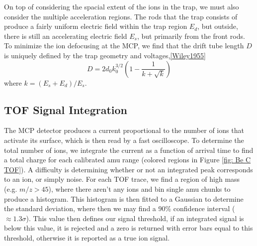 On top of considering the spacial extent of the ions in the trap, we must also consider the multiple acceleration regions. The rods that the trap consists of produce a fairly uniform electric field within the trap region $E_d$, but outside, there is still an accelerating electric field $E_s$, but primarily from the front rods. To minimize the ion defocusing at the MCP, we find that the drift tube length $D$ is uniquely defined by the trap geometry and voltages,\ref{Wiley1955}
\begin{equation}
	D = 2d_0 k_0^{3/2}\left(1-\frac{1}{k+\sqrt{k}}\right)
\end{equation}
where $k = (E_s + E_d)/E_s$.

\subsection{TOF Signal Integration}

The MCP detector produces a current proportional to the number of ions that activate its surface, which is then read by a fast oscilloscope. To determine the total number of ions, we integrate the current as a function of arrival time to find a total charge for each calibrated amu range (colored regions in Figure \ref{fig: Be C TOF}). A difficulty is determining whether or not an integrated peak corresponds to an ion, or simply noise. For each TOF trace, we find a region of high mass (e.g. $m/z > 45$), where there aren't any ions and bin single amu chunks to produce a histogram. This histogram is then fitted to a Gaussian to determine the standard deviation, where then we may find a 90\% confidence interval ($\approx 1.3 \sigma$). This value then defines our signal threshold, if an integrated signal is below this value, it is rejected and a zero is returned with error bars equal to this threshold, otherwise it is reported as a true ion signal.